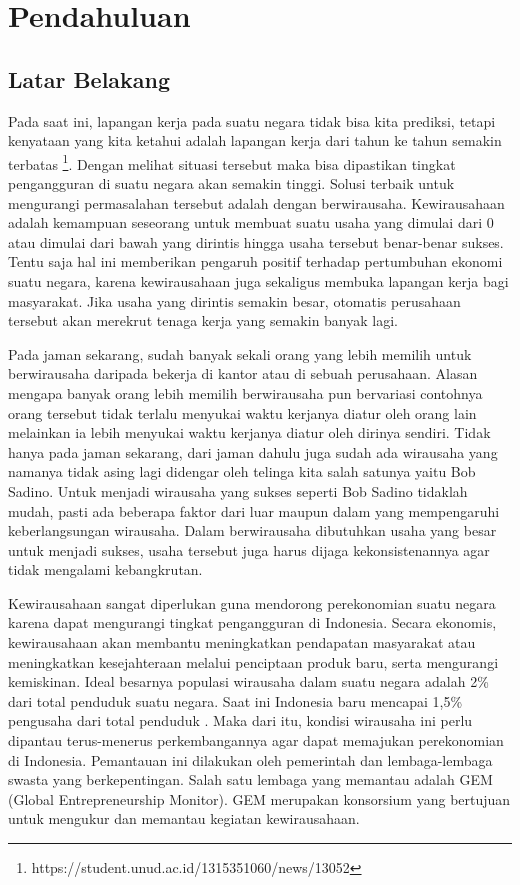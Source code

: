 \chapter{Pendahuluan}
\label{chap:intro}
   
\section{Latar Belakang}
\label{sec:label}

Pada saat ini, lapangan kerja pada suatu negara tidak bisa kita prediksi, tetapi kenyataan yang kita ketahui adalah lapangan kerja dari tahun ke tahun semakin terbatas \footnote{https://student.unud.ac.id/1315351060/news/13052}. Dengan melihat situasi tersebut maka bisa dipastikan tingkat pengangguran di suatu negara akan semakin tinggi. Solusi terbaik untuk mengurangi permasalahan tersebut adalah dengan berwirausaha. Kewirausahaan adalah kemampuan seseorang untuk membuat suatu usaha yang dimulai dari 0 atau dimulai dari bawah yang dirintis hingga usaha tersebut benar-benar sukses. Tentu saja hal ini memberikan pengaruh positif terhadap pertumbuhan ekonomi suatu negara, karena kewirausahaan juga sekaligus membuka lapangan kerja bagi masyarakat. Jika usaha yang dirintis semakin besar, otomatis perusahaan tersebut akan merekrut tenaga kerja yang semakin banyak lagi. 

 
Pada jaman sekarang, sudah banyak sekali orang yang lebih memilih untuk berwirausaha daripada bekerja di kantor atau di sebuah perusahaan. Alasan mengapa banyak orang lebih memilih berwirausaha pun bervariasi contohnya orang tersebut tidak terlalu menyukai waktu kerjanya diatur oleh orang lain melainkan ia lebih menyukai waktu kerjanya diatur oleh dirinya sendiri. Tidak hanya pada jaman sekarang, dari jaman dahulu juga sudah ada wirausaha yang namanya tidak asing lagi didengar oleh telinga kita salah satunya yaitu Bob Sadino. Untuk menjadi wirausaha yang sukses seperti Bob Sadino tidaklah mudah, pasti ada beberapa faktor dari luar maupun dalam yang mempengaruhi keberlangsungan wirausaha. Dalam berwirausaha dibutuhkan usaha yang besar untuk menjadi sukses, usaha tersebut juga harus dijaga kekonsistenannya agar tidak mengalami kebangkrutan.


Kewirausahaan sangat diperlukan guna mendorong perekonomian suatu negara karena dapat mengurangi tingkat pengangguran di Indonesia. Secara ekonomis, kewirausahaan akan membantu meningkatkan pendapatan masyarakat atau meningkatkan kesejahteraan melalui penciptaan produk baru, serta mengurangi kemiskinan.  Ideal besarnya populasi wirausaha dalam suatu negara adalah 2\% dari total penduduk suatu negara. Saat ini Indonesia baru mencapai 1,5\% pengusaha dari total penduduk \footnotemark. Maka dari itu, kondisi wirausaha ini perlu dipantau terus-menerus perkembangannya agar dapat memajukan perekonomian di Indonesia. Pemantauan ini dilakukan oleh pemerintah dan lembaga-lembaga swasta yang berkepentingan. Salah satu lembaga yang memantau adalah GEM (Global Entrepreneurship Monitor). GEM merupakan konsorsium yang bertujuan untuk mengukur dan memantau kegiatan kewirausahaan. 


